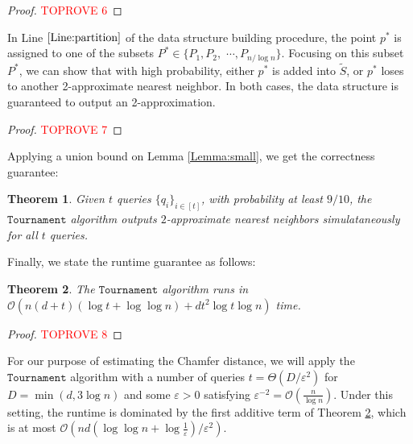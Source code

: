 \documentclass[11pt]{article}
\newcommand{\eps}{\varepsilon}
\theoremstyle{plain}
\newtheorem{theorem}{Theorem}[section]
\newcommand{\OO}{\mathcal{O}}
\newcommand{\Tournament}{\texttt{Tournament}}
\begin{document}
\begin{proof}\textcolor{red}{TOPROVE 6}\end{proof}

In Line $\ref{Line:partition}$ of the data structure building procedure, the point $p^*$ is assigned to one of the subsets $P^* \in \{P_1, P_2, $ $\cdots, P_{n/\log n}\}$. Focusing on this subset $P^*$, we can show that with high probability, either $p^*$ is added into $\tilde{S}$, or $p^*$ loses to another 2-approximate nearest neighbor. In both cases, the data structure is guaranteed to output an 2-approximation.
















\begin{proof}\textcolor{red}{TOPROVE 7}\end{proof}

Applying a union bound on Lemma \ref{Lemma:small}, we get the correctness guarantee:

\begin{theorem}
    Given $t$ queries $\{q_i\}_{i \in [t]}$, with probability at least $9/10$, the $\Tournament$ algorithm outputs $2$-approximate nearest neighbors simulataneously for all $t$ queries.
\end{theorem}

Finally, we state the runtime guarantee as follows:

\begin{theorem}\label{Theorem:tournamentTime}
    The $\Tournament$ algorithm runs in $\OO(n (d+ t) (\log t + \log \log n) + dt^2 \log t \log n) $ time.
\end{theorem}


\begin{proof}\textcolor{red}{TOPROVE 8}\end{proof}

For our purpose of estimating the Chamfer distance, we will apply the $\Tournament$ algorithm with a number of queries $t = \Theta({{D}}/\eps^2)$ for ${{D}} = \min{(d, 3\log n)}$ and some $\eps > 0$ satisfying $\eps^{-2} = \OO(\frac{n}{\log n})$. Under this setting, the runtime is dominated by the first additive term of Theorem \ref{Theorem:tournamentTime}, which is at most $\OO(n d(\log\log n+\log\frac{1}{\eps})/\eps^2)$.
\end{document}
